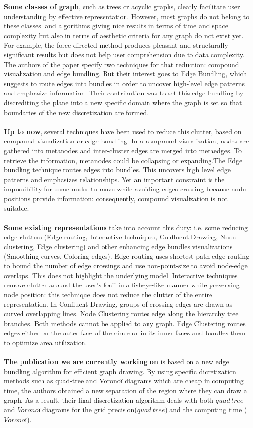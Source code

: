 \textbf{Some classes of graph}, such as trees or acyclic graphs, clearly facilitate user understanding by effective representation. However, most graphs do not belong to these classes, and algorithms giving nice results in terms of time and space complexity but also in terms of aesthetic criteria for any graph do not exist yet. For example, the force-directed method produces pleasant and structurally significant results but does not help user comprehension due to data complexity. The authors of the paper specify two techniques for that reduction: compound visualization and edge bundling. But their interest goes to Edge Bundling, which suggests to route edges into bundles in order to uncover high-level edge patterns and emphasize information. Their contribution was to set this edge bundling by discrediting the plane into a new specific domain where the graph is set so that boundaries of the new discretization are formed.
\\
\\
\textbf{Up to now}, several techniques have been used to reduce this clutter, based on compound visualization or edge bundling. In a compound visualization, nodes are gathered into metanodes and inter-cluster edges are merged into metaedges. To retrieve the information, metanodes could be collapsing or expanding.The Edge bundling technique routes edges into bundles. This uncovers high level edge patterns and emphasizes relationships.
Yet an important constraint is the impossibility for some nodes to move while avoiding edges crossing because node positions provide information: consequently, compound visualization is not suitable.
\\
\\
\textbf{Some existing representations} take into account this duty: i.e.  some reducing edge clutters (Edge routing, Interactive techniques, Confluent Drawing, Node clustering, Edge clustering) and other enhancing edge bundles visualizations (Smoothing curves, Coloring edges). Edge routing uses shortest-path edge routing to bound the number of edge crossings and use non-point-size to avoid node-edge overlaps. This does not highlight the underlying model. Interactive techniques remove clutter around the user’s focii in a fisheye-like manner while preserving node position: this technique does not reduce the clutter of the entire representation. In Confluent Drawing, groups of crossing edges are drawn as curved overlapping lines. Node Clustering routes edge along the hierarchy tree branches. Both methods cannot be applied to any graph.
Edge Clustering routes edges either on the outer face of the circle or in its inner faces and bundles them to optimize area utilization.
\\
\\
\textbf{The publication we are currently working on} is based on a new edge bundling algorithm for efficient graph drawing. By using specific  dicretization methods such as quad-tree and Voronoï diagrams which are cheap in computing time, the authors obtained a new separation of the region where they can draw a graph. As a result, their final discretization algorithm deals with both $quad~tree$ and $Voronoï$ diagrams for the grid precision($quad~tree$) and the computing time ($Voronoï$).

